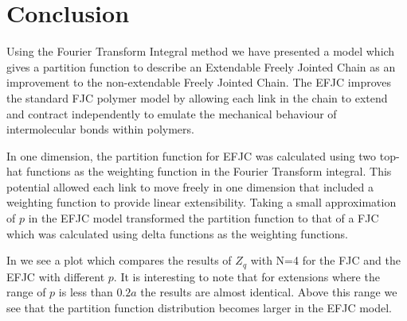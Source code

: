 \newpage

\section{Conclusion}

Using the Fourier Transform Integral method we have presented a model which gives a partition function to describe an Extendable Freely Jointed Chain as an improvement to the non-extendable Freely Jointed Chain. The EFJC improves the standard FJC polymer model by allowing each link in the chain to extend and contract independently to emulate the mechanical behaviour of intermolecular bonds within polymers. 

In one dimension, the partition function for EFJC was calculated using two top-hat functions as the weighting function in the Fourier Transform integral. This potential allowed each link to move freely in one dimension that included a weighting function to provide linear extensibility. Taking a small approximation of $p$ in the EFJC model transformed the partition function to that of a FJC which was calculated using delta functions as the weighting functions. 

In  we see a plot which compares the results of $Z_{q}$ with N=4 for the FJC and the EFJC with different $p$. It is interesting to note that for extensions where the range of $p$ is less than $0.2a$ the results are almost identical. Above this range we see that the partition function distribution becomes larger in the EFJC model. 

